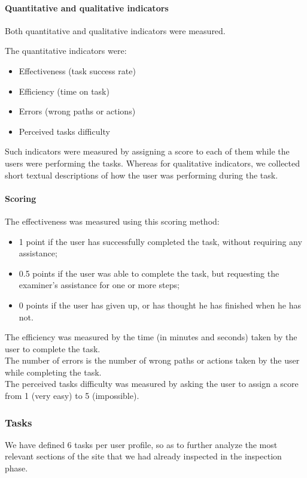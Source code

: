     \paragraph{Quantitative and qualitative indicators}
    Both quantitative and qualitative indicators were measured. 
    
    The quantitative indicators were:
    \begin{itemize}
        \item Effectiveness (task success rate)
        \item Efficiency (time on task)
        \item Errors (wrong paths or actions)
        \item Perceived tasks difficulty
    \end{itemize}

    Such indicators were measured by assigning a score to each of them while the users were performing the tasks. Whereas for qualitative indicators, we collected short textual descriptions of how the user was performing during the task.

    \paragraph{Scoring}
    The effectiveness was measured using this scoring method:
    \begin{itemize}
        \item 1 point if the user has successfully completed the task, without requiring any assistance;
        \item 0.5 points if the user was able to complete the task, but requesting the examiner's assistance for one or more steps;
        \item 0 points if the user has given up, or has thought he has finished when he has not.
    \end{itemize}

    The efficiency was measured by the time (in minutes and seconds) taken by the user to complete the task.\\
    The number of errors is the number of wrong paths or actions taken by the user while completing the task.\\
    The perceived tasks difficulty was measured by asking the user to assign a score from 1 (very easy)  to 5 (impossible).

    \subsubsection{Tasks}
    We have defined 6 tasks per user profile, so as to further analyze the most relevant sections of the site that we had already inspected in the inspection phase.

